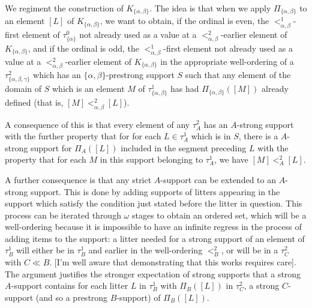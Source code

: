 \documentclass{slides}
\begin{document}
\begin{slide}

We regiment the construction of $K_{\{\alpha,\beta\}}$.  The idea is that when we apply $\Pi_{\{\alpha,\beta\}}$ to an  element $[L]$ of $K_{\{\alpha,\beta\}}$, we want to obtain, if the ordinal is even, the $<^1_{\alpha,\beta}$-first element of $\tau^0_{\{\alpha\}}$ not already used as a value at  a $<^2_{\alpha,\beta}$-earlier element of $K_{\{\alpha,\beta\}}$, and if the ordinal is odd,
the $<^1_{\alpha,\beta}$-first element not already used as a value at  a $<^2_{\alpha,\beta}$-earlier element of $K_{\{\alpha,\beta\}}$ in the appropriate well-ordering of a $\tau^2_{\{\alpha,\beta,\gamma\}}$ which has an $\{\alpha,\beta\}$-prestrong support $S$ such that any element of the domain of $S$ which is an element $M$ of $\tau^1_{\{\alpha,\beta\}}$ 
has had $\Pi_{\{\alpha,\beta\}}([M])$ already defined (that is, $[M] <^2_{\alpha,\beta} [L]$).

\end{slide}

\begin{slide}

A consequence of this is that every element of any $\tau^2_A$ has an $A$-strong support with the further property that for for each $L \in \tau^1_A$ which is in $S$,
there is a $A$-strong support for $\Pi_A([L])$ included in the segment  preceding $L$ with the property that for each $M$ in this support belonging to $\tau^1_A$, we have $[M]<^2_A[L]$.

A further consequence is that any strict $A$-support  can be extended to an $A$-strong support.  This is done by adding supports of litters appearing in the support which
satisfy the condition just stated before the litter in question.  This process can be iterated through $\omega$ stages to obtain an ordered set, which will be a well-ordering because it is impossible to have an infinite regress in the process of adding items to the support:  a litter  needed for a strong support of an element of $\tau^1_B$ will either be in $\tau^1_B$ and earlier in the well-ordering $<^2_B$, or will be in a $\tau^2_C$ with $C\ll B$.  [I'm well aware that demonstrating that this works requires care].  The argument  justifies the stronger expectation of strong supports that a strong $A$-support contains for each litter $L$ in $\tau^1_B$ with $\Pi_B([L])$ in $\tau^2_C$, a strong $C$-support (and so a prestrong $B$-support) of $\Pi_B([L])$.


\end{slide}
\end{document}
